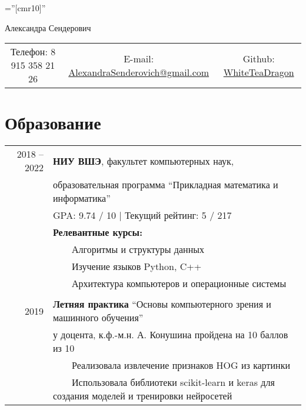 \documentclass[a4paper,10pt]{article}
\newcommand{\tabitem}{~~\llap{\textbullet}~~}
\begin{document}

\pagestyle{empty} %

\font\fb=''[cmr10]'' %

\par{\centering
		{\Huge Александра Сендерович
	}\bigskip\par}


\begin{center}
\begin{tabular}{c c c}
     Телефон: 8 915 358 21 26 & E-mail: \href{mailto:alexandrasenderovich@gmail.com}{AlexandraSenderovich@gmail.com} & Github: \href{https://github.com/WhiteTeaDragon}{WhiteTeaDragon}
\end{tabular}
\end{center}

\section{Образование}
\begin{tabular}{rl}	
2018 -- 2022 & \textbf{НИУ ВШЭ}, факультет компьютерных наук, \\ & образовательная программа ``Прикладная математика и информатика''\\
& GPA: 9.74 / 10 | Текущий рейтинг: 5 / 217 \\
& \textbf{Релевантные курсы:}\\
& \tabitem Алгоритмы и структуры данных \\
& \tabitem Изучение языков Python, C++ \\
& \tabitem Архитектура компьютеров и операционные системы \\
& \\
2019 & \textbf{Летняя практика} ``Основы компьютерного зрения и машинного обучения'' \\
& у доцента, к.ф.-м.н. А. Конушина пройдена на 10 баллов из 10 \\
& \tabitem Реализовала извлечение признаков HOG из картинки \\
& \tabitem Использовала библиотеки scikit-learn и keras для создания моделей и тренировки нейросетей 
\end{tabular}
\end{document}
